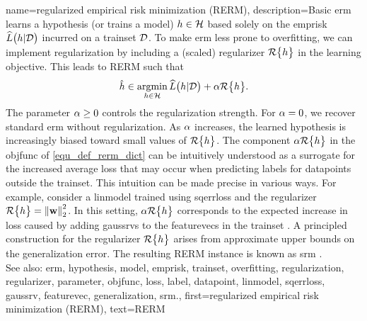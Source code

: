 {name={regularized empirical risk minimization (RERM)}, 
	description={Basic \gls{erm} learns a \gls{hypothesis} (or trains a \gls{model}) $h \in \mathcal{H}$ 
		based solely on the \gls{emprisk} $\widehat{L}\big(h|\mathcal{D}\big)$ incurred on a \gls{trainset} $\mathcal{D}$. 
		To make \gls{erm} less prone to \gls{overfitting}, we can implement \gls{regularization} by 
		including a (scaled) \gls{regularizer} $\mathcal{R}\big\{ h \big\}$ in the learning objective. 
		This leads to RERM such that
		\begin{equation}
			\label{equ_def_rerm_dict}
			\hat{h} \in \operatorname*{argmin}_{h \in \mathcal{H}} \widehat{L}\big(h|\mathcal{D}\big) + \alpha \mathcal{R}\big\{ h \big\}.
		\end{equation}
		The \gls{parameter} $\alpha \geq 0$ controls the \gls{regularization} strength. 
		For $\alpha = 0$, we recover standard \gls{erm} without \gls{regularization}. As $\alpha$ increases, the 
		learned \gls{hypothesis} is increasingly biased toward small values of $\mathcal{R}\big\{ h \big\}$. 
		The component $\alpha \mathcal{R}\big\{ h \big\}$ in the \gls{objfunc} of \eqref{equ_def_rerm_dict} 
		can be intuitively understood as a surrogate for the increased average \gls{loss} that may 
		occur when predicting \glspl{label} for \glspl{datapoint} outside the \gls{trainset}. This intuition  
		can be made precise in various ways. For example, consider a \gls{linmodel} trained using \gls{sqerrloss} 
		and the \gls{regularizer} $\mathcal{R}\big\{ h \big\} = \left\Vert {{\bf w}} \right\Vert_{2}^{2}$. 
		In this setting, $\alpha \mathcal{R}\big\{ h \big\}$ corresponds to the expected increase in \gls{loss} 
		caused by adding \glspl{gaussrv} to the \glspl{featurevec} in the \gls{trainset} 
		\cite[Ch. 3]{MLBasics}.
		A principled construction for the \gls{regularizer} $\mathcal{R}\big\{ h \big\}$ 
		arises from approximate upper bounds on the \gls{generalization} error. The resulting 
		RERM instance is known as \gls{srm} \cite[Sec. 7.2]{ShalevShwartz2009}.
				\\
		See also: \gls{erm}, \gls{hypothesis}, \gls{model}, \gls{emprisk}, \gls{trainset}, \gls{overfitting}, \gls{regularization}, \gls{regularizer}, \gls{parameter}, \gls{objfunc}, \gls{loss}, \gls{label}, \gls{datapoint}, \gls{linmodel}, \gls{sqerrloss}, \gls{gaussrv}, \gls{featurevec}, \gls{generalization}, \gls{srm}.}, 
	first={regularized empirical risk minimization (RERM)},
	text={RERM} 
}


